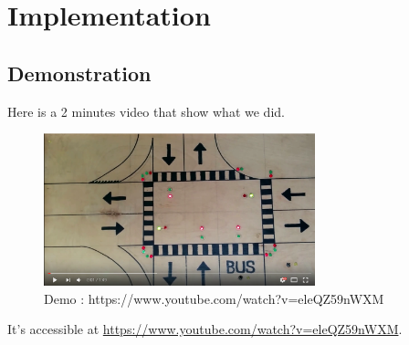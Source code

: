\section{Implementation}




\subsection{Demonstration}

Here is a 2 minutes video that show what we did.

\begin{figure}[H]\label{fig:ytv}
  \centering
    \includegraphics[width=0.7\textwidth]{picture/demo.png}
    \caption{Demo : https://www.youtube.com/watch?v=eleQZ59nWXM}
\end{figure}

It's accessible at \url{https://www.youtube.com/watch?v=eleQZ59nWXM}.
